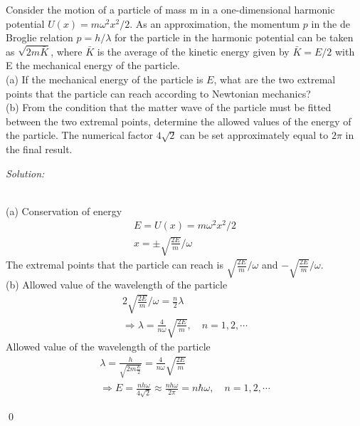 \documentclass[12pt]{article}
\newenvironment{problem}[2][Problem]{\begin{trivlist}
\item[\hskip \labelsep {\bfseries #1}\hskip \labelsep {\bfseries #2.}]}{\end{trivlist}}
\newenvironment{sol}
    {\emph{Solution:}
    }
    {
    \qed
    }
\begin{document}
\begin{problem}{4}
Consider the motion of a particle of mass m in a one-dimensional harmonic potential $U(x)=m\omega^2x^2/2$. As an approximation, the momentum $p$ in the de Broglie relation $p=h/\lambda$ for the particle in the harmonic potential can be taken as $\sqrt{2m\bar{K}}$, where $\bar{K}$ is the average of the kinetic energy given by $\bar{K}=E/2$ with E the mechanical energy of the particle.\\
(a) If the mechanical energy of the particle is $E$, what are the two extremal points that the particle can reach according to Newtonian mechanics?\\
(b) From the condition that the matter wave of the particle must be fitted between the two extremal points, determine the allowed values of the energy of the particle. The numerical factor $4\sqrt{2}$ can be set approximately equal to $2\pi$ in the final result.
\end{problem}
\begin{sol}
\\(a) Conservation of energy
\begin{gather}
E=U(x)=m\omega^2x^2/2\\
x=\pm\sqrt{\frac{2E}{m}}/\omega
\end{gather}
The extremal points that the particle can reach is $\sqrt{\frac{2E}{m}}/\omega$ and $-\sqrt{\frac{2E}{m}}/\omega$.\\
(b) Allowed value of the wavelength of the particle
\begin{gather}
2\sqrt{\frac{2E}{m}}/\omega=\frac{n}{2}\lambda\\
\Longrightarrow\lambda=\frac{4}{n\omega}\sqrt{\frac{2E}{m}},\quad n=1,2,\cdots
\end{gather}
Allowed value of the wavelength of the particle
\begin{gather}
\lambda=\frac{h}{\sqrt{2m\frac{E}{2}}}=\frac{4}{n\omega}\sqrt{\frac{2E}{m}}\\
\Longrightarrow E=\frac{nh\omega}{4\sqrt{2}}\approx\frac{nh\omega}{2\pi}=n\hbar\omega,\quad n=1,2,\cdots
\end{gather}
\end{sol}
\end{document}
